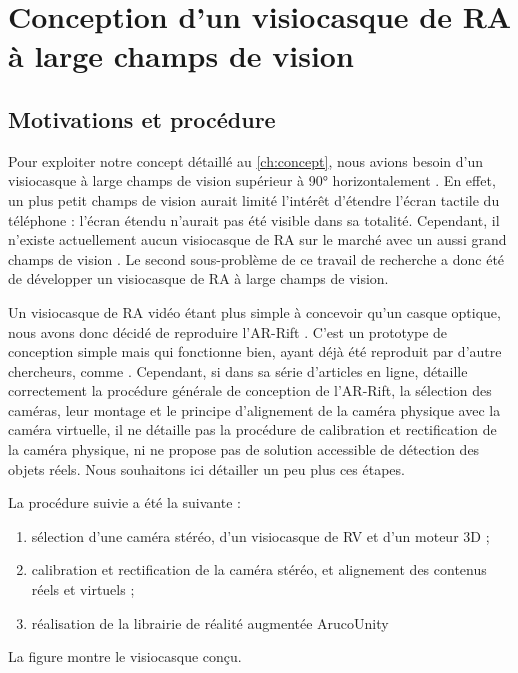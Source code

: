 \chapter{Conception d'un visiocasque de RA à large champs de vision}
\label{ch:methodology}

\section{Motivations et procédure}
Pour exploiter notre concept détaillé au \autoref{ch:concept}, nous avions besoin d'un visiocasque à large champs de vision supérieur à \ang{90} horizontalement . En effet, un plus petit champs de vision aurait limité l'intérêt d'étendre l'écran tactile du téléphone : l'écran étendu n'aurait pas été visible dans sa totalité. Cependant, il n'existe actuellement aucun visiocasque de RA sur le marché avec un aussi grand champs de vision \citep{Millette2016}. Le second sous-problème de ce travail de recherche a donc été de développer un visiocasque de RA à large champs de vision.


Un visiocasque de RA vidéo étant plus simple à concevoir qu'un casque optique, nous avons donc décidé de reproduire l'AR-Rift \citep{Steptoe2013}. C'est un prototype de conception simple mais qui fonctionne bien, ayant déjà été reproduit par d'autre chercheurs, comme \cite{Piumsomboon2014}.
Cependant, si dans sa série d'articles en ligne, \citeauthor{Steptoe2013} détaille correctement la procédure générale de conception de l'AR-Rift, la sélection des caméras, leur montage et le principe d'alignement de la caméra physique avec la caméra virtuelle, il ne détaille pas la procédure de calibration et rectification de la caméra physique, ni ne propose pas de solution accessible de détection des objets réels. Nous souhaitons ici détailler un peu plus ces étapes.

La procédure suivie a été la suivante :
\begin{enumerate}
  \item sélection d'une caméra stéréo, d'un visiocasque de RV et d'un moteur 3D ;
  \item calibration et rectification de la caméra stéréo, et alignement des contenus réels et virtuels ;
  \item réalisation de la librairie de réalité augmentée ArucoUnity
\end{enumerate}
La figure  montre le visiocasque conçu.

